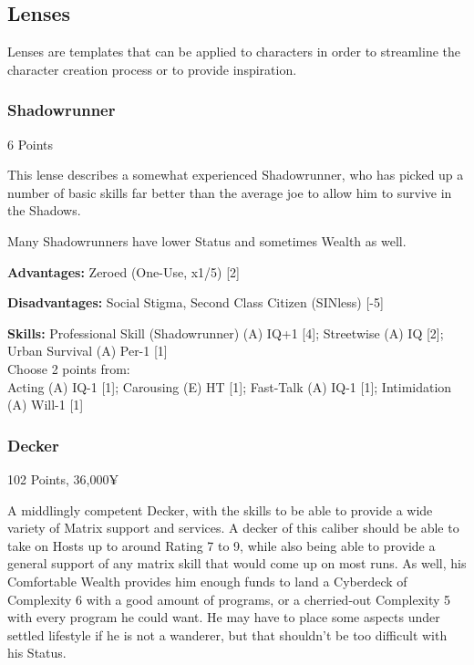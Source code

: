 \begin{multicols*}{2}
	
	\subsection{Lenses}
	
	Lenses are templates that can be applied to characters in order to streamline the character creation process or to provide inspiration.
	
	\subsubsection{Shadowrunner}
	\begin{flushright}
		6 Points
	\end{flushright}
	
	This lense describes a somewhat experienced Shadowrunner, who has picked up a number of basic skills far better than the average joe to allow him to survive in the Shadows.
	
	Many Shadowrunners have lower Status and sometimes Wealth as well.
	
	
	\textbf{Advantages:}
	Zeroed (One-Use, x1/5) [2]
	
	\textbf{Disadvantages:}
	Social Stigma, Second Class Citizen (SINless) [-5]
	
	\textbf{Skills:}
	Professional Skill (Shadowrunner) (A) IQ+1 [4]; Streetwise (A) IQ [2]; Urban Survival (A) Per-1 [1]\\
	Choose 2 points from:\\
	Acting (A) IQ-1 [1]; Carousing (E) HT [1]; Fast-Talk (A) IQ-1 [1]; Intimidation (A) Will-1 [1]
	
	\subsubsection{Decker}
	\begin{flushright}
		102 Points, 36,000¥
	\end{flushright}
	
	A middlingly competent Decker, with the skills to be able to provide a wide variety of Matrix support and services. A decker of this caliber should be able to take on Hosts up to around Rating 7 to 9, while also being able to provide a general support of any matrix skill that would come up on most runs. As well, his Comfortable Wealth provides him enough funds to land a Cyberdeck of Complexity 6 with a good amount of programs, or a cherried-out Complexity 5 with every program he could want. He may have to place some aspects under settled lifestyle if he is not a wanderer, but that shouldn't be too difficult with his Status.
	

\end{multicols*}
